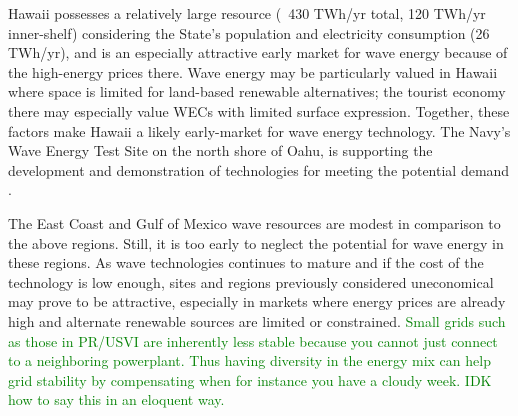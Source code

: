 Hawaii possesses a relatively large resource (~430 TWh/yr total, 120 TWh/yr inner-shelf) considering the State's population and electricity consumption (26 TWh/yr), and is an especially attractive early market for wave energy because of the high-energy prices there. 
Wave energy may be particularly valued in Hawaii where space is limited for land-based renewable alternatives; the tourist economy there may especially value WECs with limited surface expression. Together, these factors make Hawaii a likely early-market for wave energy technology. The Navy's Wave Energy Test Site on the north shore of Oahu, is supporting the development and demonstration of technologies for meeting the potential demand \citep{crossEarlyResearchEfforts2015}.

The East Coast and Gulf of Mexico wave resources are modest in comparison to the above regions. Still, it is too early to neglect the potential for wave energy in these regions. As wave technologies continues to mature and if the cost of the technology is low enough, sites and regions previously considered uneconomical may prove to be attractive, especially in markets where energy prices are already high and alternate renewable sources are limited or constrained. \textcolor{green}{Small grids such as those in PR/USVI are inherently less stable because you cannot just connect to a neighboring powerplant. Thus  having diversity in the energy mix can help grid stability by compensating when for instance you have a cloudy week. IDK how to say this in an eloquent way.}

